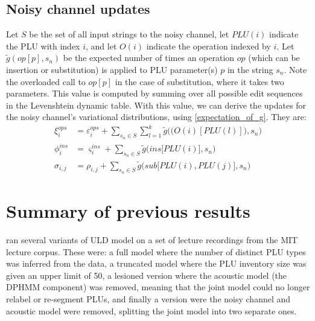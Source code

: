 \documentclass[12pt,letterpaper]{article}
\begin{document}
\subsection{Noisy channel updates}
Let $S$ be the set of all input strings to the noisy channel, let $PLU(i)$ indicate the PLU with index $i$, and let $O(i)$ indicate the operation indexed by $i$. Let $\tilde g(op[p], s_n)$ be the expected number of times an operation $op$ (which can be insertion or substitution) is applied to PLU parameter(s) $p$ in the string $s_n$. Note the overloaded call to $op[p]$ in the case of substitution, where it takes two parameters. This value is computed by summing over all possible edit sequences in the Levenshtein dynamic table. With this value, we can derive the updates for the noisy channel's variational distributions, using \eqref{expectation_of_g}. They are:
\begin{align*}
\nonumber \xi^{ops}_i &= \varepsilon^{ops}_i + \sum\limits_{s_n \in S}\sum\limits_{l = 1}^k \tilde g\Big(\big( O(i)[PLU(l)]\big), s_n\Big) \\
\nonumber \phi^{ins}_i &= \varsigma^{ins}_i + \sum\limits_{s_n \in S} \tilde g\Big(ins\big[PLU(i)\big], s_n\Big)\\
\nonumber \sigma_{i,j} &= \rho_{i,j} + \sum\limits_{s_n \in S} \tilde g\Big(sub\big[PLU(i), PLU(j)\big], s_n\Big)
\end{align*}

\section{Summary of previous results}
\citet{lee:2015} ran several variants of ULD model on a set of lecture recordings from the MIT lecture corpus. These were: a full model where the number of distinct PLU types was inferred from the data, a truncated model where the PLU inventory size was given an upper limit of 50, a lesioned version where the acoustic model (the DPHMM component) was removed, meaning that the joint model could no longer relabel or re-segment PLUs, and finally a version were the noisy channel and acoustic model were removed, splitting the joint model into two separate ones. 
\end{document}
